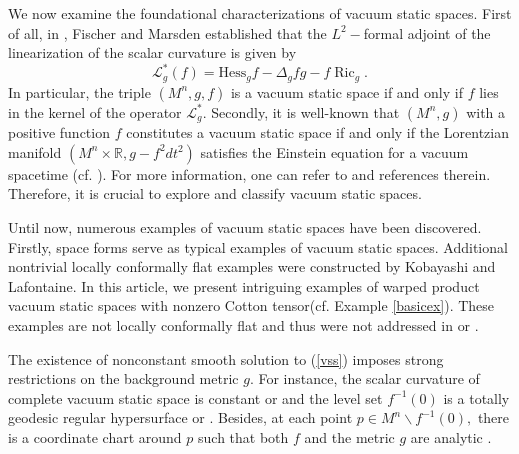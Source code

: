 \documentclass[10pt,leqno,oneside]{amsart}
\begin{document}
          We now examine the foundational characterizations of vacuum static spaces. First of all, in \cite{FM1975Duke}, Fischer and Marsden established that the $L^2-$formal adjoint of the linearization of the scalar curvature is given by
          $$\mathcal{L}_{ g}^{*}(f)=\text{Hess}_{g}f-\Delta_{g} fg-f\operatorname{Ric}_{g}.$$
          In particular, the triple $(M^n,g, f)$ is a vacuum static space if and only if $f$ lies in the kernel of the operator $\mathcal{L}_{ g}^{*}.$ Secondly, it is well-known that $(M^n, g)$ with a positive function $f$ constitutes a vacuum static space if and only if the Lorentzian manifold $(M^n\times\mathbb R, g-f^2dt^2)$ satisfies the Einstein equation for a vacuum spacetime (cf. \cite[Proposition 2.7]{Cor2000CMP}). For more information, one can refer to \cite{KobayashiObata1981} \cite{Beig1992} \cite{Cor2000CMP} and references therein. Therefore, it is crucial to explore and classify vacuum static spaces. 

          Until now, numerous examples of vacuum static spaces have been discovered. Firstly, space forms serve as typical examples of vacuum static spaces. Additional nontrivial locally conformally flat examples were constructed by Kobayashi \cite{Kobayashi1982} and Lafontaine\cite{Lafontaine1983}. In this article, we present intriguing examples of warped product vacuum static spaces with nonzero Cotton tensor(cf. Example \ref{basicex}). These examples are not locally conformally flat and thus were not addressed in \cite{Kobayashi1982} or \cite{Lafontaine1983}.

          The existence of nonconstant smooth solution to (\ref{vss}) imposes strong restrictions on the background metric $g.$ For instance, the scalar curvature of complete vacuum static space is constant \cite{FM1975Duke} or \cite[Proposition 2.3]{Cor2000CMP} and the level set $f^{-1}(0)$ is a totally geodesic regular hypersurface \cite{Bourguignon1975} or \cite[Proposition 2.6]{Cor2000CMP}. Besides, at each point $p\in M^n\backslash f^{-1}(0),$ there is a coordinate chart around $p$ such that both $f$ and the metric $g$ are analytic \cite[Proposition 2.8]{Cor2000CMP}.
\end{document}

